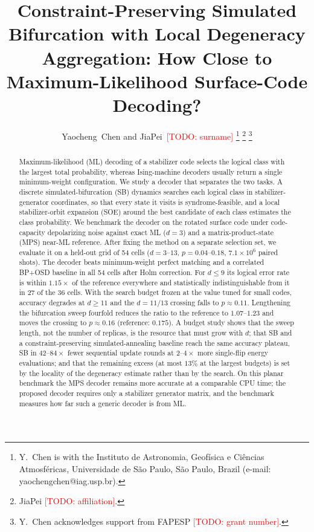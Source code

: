 \documentclass[journal]{IEEEtran}
\newcommand{\todo}[1]{\textcolor{red}{[TODO: #1]}}
\begin{document}
\title{Constraint-Preserving Simulated Bifurcation with Local Degeneracy Aggregation: How Close to Maximum-Likelihood Surface-Code Decoding?}

\author{Yaocheng~Chen and JiaPei~\todo{surname}%
\thanks{Y.~Chen is with the Instituto de Astronomia, Geof\'isica e Ci\^encias Atmosf\'ericas, Universidade de S\~ao Paulo, S\~ao Paulo, Brazil (e-mail: yaochengchen@iag.usp.br).}%
\thanks{JiaPei \todo{affiliation}.}%
\thanks{Y.~Chen acknowledges support from FAPESP \todo{grant number}.}}


\maketitle

\begin{abstract}
Maximum-likelihood (ML) decoding of a stabilizer code selects the logical class with the largest total probability, whereas Ising-machine decoders usually return a single minimum-weight configuration. We study a decoder that separates the two tasks. A discrete simulated-bifurcation (SB) dynamics searches each logical class in stabilizer-generator coordinates, so that every state it visits is syndrome-feasible, and a local stabilizer-orbit expansion (SOE) around the best candidate of each class estimates the class probability. We benchmark the decoder on the rotated surface code under code-capacity depolarizing noise against exact ML ($d=3$) and a matrix-product-state (MPS) near-ML reference. After fixing the method on a separate selection set, we evaluate it on a held-out grid of 54 cells ($d=3$--$13$, $p=0.04$--$0.18$, $7.1\times10^{6}$ paired shots). The decoder beats minimum-weight perfect matching and a correlated BP+OSD baseline in all 54 cells after Holm correction. For $d\le 9$ its logical error rate is within $1.15\times$ of the reference everywhere and statistically indistinguishable from it in 27 of the 36 cells. With the search budget frozen at the value tuned for small codes, accuracy degrades at $d\ge 11$ and the $d=11/13$ crossing falls to $p\approx0.11$. Lengthening the bifurcation sweep fourfold reduces the ratio to the reference to $1.07$--$1.23$ and moves the crossing to $p\approx0.16$ (reference: $0.175$). A budget study shows that the sweep length, not the number of replicas, is the resource that must grow with $d$; that SB and a constraint-preserving simulated-annealing baseline reach the same accuracy plateau, SB in $42$--$84\times$ fewer sequential update rounds at $2$--$4\times$ more single-flip energy evaluations; and that the remaining excess (at most $13\%$ at the largest budgets) is set by the locality of the degeneracy estimate rather than by the search. On this planar benchmark the MPS decoder remains more accurate at a comparable CPU time; the proposed decoder requires only a stabilizer generator matrix, and the benchmark measures how far such a generic decoder is from ML.
\end{abstract}
\end{document}
